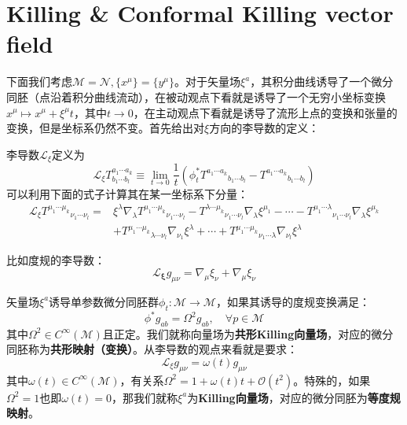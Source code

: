 \section{Killing \& Conformal Killing vector field}
下面我们考虑$\mathcal{M}=\mathcal{N},\{x^\mu\}=\{y^\mu\}$。对于矢量场$\xi^a$，其积分曲线诱导了一个微分同胚（点沿着积分曲线流动），在被动观点下看就是诱导了一个无穷小坐标变换$x^\mu\mapsto x^\mu+\xi^\mu t$，其中$t\to0$，在主动观点下看就是诱导了流形上点的变换和张量的变换，但是坐标系仍然不变。首先给出对$\xi$方向的李导数的定义：
\begin{definition}[李导数]
	李导数$\mathscr{L}_\xi$定义为
	\[\mathscr{L}_{\xi}T^{{a_1\cdots a_k}}_{b_1\cdots b_l}\equiv\lim_{t\to0}\frac{1}{t}\left(\phi_t^*{T^{a_1\cdots a_k}}_{b_1\cdots b_l}-{T^{a_1\cdots a_k}}_{b_1\cdots b_l}\right)\]
	可以利用下面的式子计算其在某一坐标系下分量：
	\begin{equation}\label{lie}
		\begin{aligned}
			\mathscr{L}_{\xi}{T^{\mu_1\cdots \mu_k}}_{\nu_1\cdots\nu_l}=&\xi^\lambda\nabla_\lambda{T^{\mu_1\cdots \mu_k}}_{\nu_1\cdots\nu_l}-{T^{\lambda\cdots \mu_k}}_{\nu_1\cdots\nu_l}\nabla_\lambda\xi^{\mu_1}-\cdots-{T^{\mu_1\cdots \lambda}}_{\nu_1\cdots\nu_l}\nabla_\lambda\xi^{\mu_k}\\
			&+{T^{\mu_1\cdots \mu_k}}_{\lambda\cdots\nu_l}\nabla_{\nu_1}\xi^{\lambda}+\cdots+{T^{\mu_1\cdots \mu_k}}_{\nu_1\cdots\lambda}\nabla_{\nu_l}\xi^{\lambda}
		\end{aligned}		
	\end{equation}
\end{definition}
比如度规的李导数：
\begin{equation}
	\mathscr{L}_\mathbf{\xi} g_{\mu\nu}=\nabla_\mu\xi_\nu+\nabla_\mu\xi_\nu	
\end{equation}
\begin{definition}[Killing]
	矢量场$\xi^a$诱导单参数微分同胚群$\phi_t:\mathcal{M}\to\mathcal{M}$，如果其诱导的度规变换满足：
	\begin{equation}
		\phi^*g_{ab}=\Omega^2g_{ab},\quad \forall p\in\mathcal{M}
	\end{equation}
	其中$\Omega^2\in C^\infty(\mathcal{M})$且正定。我们就称向量场为\textbf{共形Killing向量场}，对应的微分同胚称为\textbf{共形映射（变换）}。从李导数的观点来看就是要求：
	\begin{equation}
		\mathscr{L}_\xi g_{\mu\nu}=\omega(t)g_{\mu\nu}
	\end{equation}
	其中$\omega(t)\in C^\infty(\mathcal{M})$，有关系$\Omega^2=1+\omega(t)t+\mathcal{O}(t^2)$。特殊的，如果$\Omega^2=1$也即$\omega(t)=0$，那我们就称$\xi^a$为\textbf{Killing向量场}，对应的微分同胚为\textbf{等度规映射}。
\end{definition}
